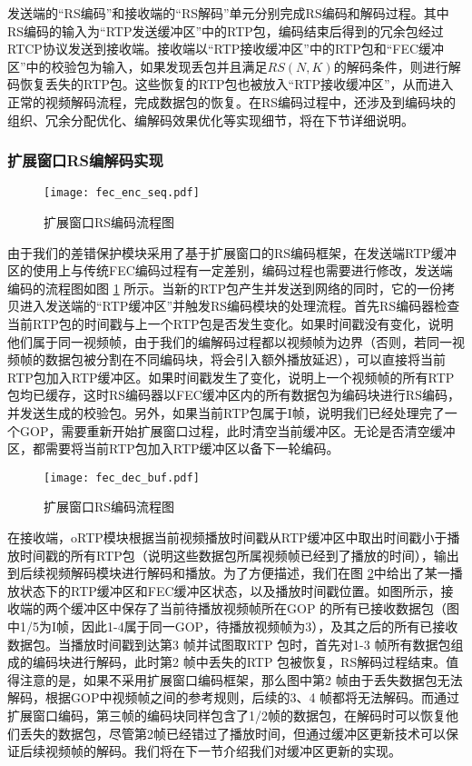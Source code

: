     发送端的``RS编码''和接收端的``RS解码''单元分别完成RS编码和解码过程。其中RS编码的输入为``RTP发送缓冲区''中的RTP包，编码结束后得到的冗余包经过RTCP协议发送到接收端。接收端以``RTP接收缓冲区''中的RTP包和``FEC缓冲区''中的校验包为输入，如果发现丢包并且满足$RS(N,K)$的解码条件，则进行解码恢复丢失的RTP包。这些恢复的RTP包也被放入``RTP接收缓冲区''，从而进入正常的视频解码流程，完成数据包的恢复。在RS编码过程中，还涉及到编码块的组织、冗余分配优化、编解码效果优化等实现细节，将在下节详细说明。

    \subsubsection{扩展窗口RS编解码实现}
    \begin{figure}[htbp]
      \centering
      \texttt{[image: fec\_enc\_seq.pdf]}
      \caption{扩展窗口RS编码流程图}
      \label{fig:fec_enc_seq}
    \end{figure}

    由于我们的差错保护模块采用了基于扩展窗口的RS编码框架，在发送端RTP缓冲区的使用上与传统FEC编码过程有一定差别，编码过程也需要进行修改，发送端编码的流程图如图 \ref{fig:fec_enc_seq} 所示。当新的RTP包产生并发送到网络的同时，它的一份拷贝进入发送端的``RTP缓冲区''并触发RS编码模块的处理流程。首先RS编码器检查当前RTP包的时间戳与上一个RTP包是否发生变化。如果时间戳没有变化，说明他们属于同一视频帧，由于我们的编解码过程都以视频帧为边界（否则，若同一视频帧的数据包被分割在不同编码块，将会引入额外播放延迟），可以直接将当前RTP包加入RTP缓冲区。如果时间戳发生了变化，说明上一个视频帧的所有RTP包均已缓存，这时RS编码器以FEC缓冲区内的所有数据包为编码块进行RS编码，并发送生成的校验包。另外，如果当前RTP包属于I帧，说明我们已经处理完了一个GOP，需要重新开始扩展窗口过程，此时清空当前缓冲区。无论是否清空缓冲区，都需要将当前RTP包加入RTP缓冲区以备下一轮编码。

    \begin{figure}[htbp]
      \centering
      \texttt{[image: fec\_dec\_buf.pdf]}
      \caption{扩展窗口RS编码流程图}
      \label{fig:fec_dec_buf}
    \end{figure}

    在接收端，oRTP模块根据当前视频播放时间戳从RTP缓冲区中取出时间戳小于播放时间戳的所有RTP包（说明这些数据包所属视频帧已经到了播放的时间），输出到后续视频解码模块进行解码和播放。为了方便描述，我们在图 \ref{fig:fec_dec_buf}中给出了某一播放状态下的RTP缓冲区和FEC缓冲区状态，以及播放时间戳位置。如图所示，接收端的两个缓冲区中保存了当前待播放视频帧所在GOP 的所有已接收数据包（图中1/5为I帧，因此1-4属于同一GOP，待播放视频帧为3），及其之后的所有已接收数据包。当播放时间戳到达第3 帧并试图取RTP 包时，首先对1-3 帧所有数据包组成的编码块进行解码，此时第2 帧中丢失的RTP 包被恢复，RS解码过程结束。值得注意的是，如果不采用扩展窗口编码框架，那么图中第2 帧由于丢失数据包无法解码，根据GOP中视频帧之间的参考规则，后续的3、4 帧都将无法解码。而通过扩展窗口编码，第三帧的编码块同样包含了1/2帧的数据包，在解码时可以恢复他们丢失的数据包，尽管第2帧已经错过了播放时间，但通过缓冲区更新技术可以保证后续视频帧的解码。我们将在下一节介绍我们对缓冲区更新的实现。

